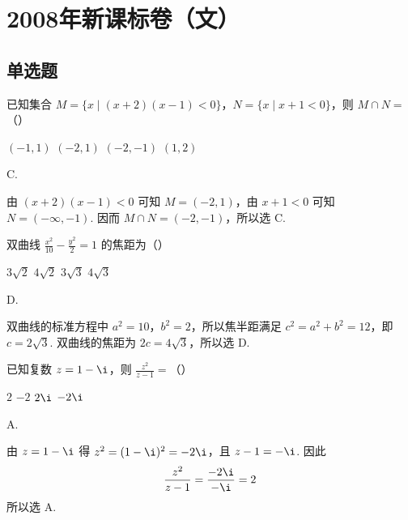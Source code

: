 \chapter{2008年新课标卷（文）}

\section{单选题}

\begin{problem}
已知集合 \(M = \{x \mid (x + 2)(x - 1) < 0\}\)，\(N = \{x \mid x + 1 < 0\}\)，则 \(M \cap N =\)（\quad）

\choices
    {\((-1, 1)\)}
    {\((-2, 1)\)}
    {\((-2, -1)\)}
    {\((1,2)\)}
\end{problem}

\begin{answer}
C.
\end{answer}

\begin{solution}
由 \((x+2)(x-1)<0\) 可知 \(M=(-2,1)\)，由 \(x+1<0\) 可知 \(N=(-\infty,-1)\). 因而 \(M\cap N=(-2,-1)\)，所以选 C.
\end{solution}

\begin{problem}
双曲线 \(\frac{x^2}{10} - \frac{y^2}{2} = 1\) 的焦距为（\quad）

\choices
    {\(3\sqrt{2}\)}
    {\(4\sqrt{2}\)}
    {\(3\sqrt{3}\)}
    {\(4\sqrt{3}\)}
\end{problem}

\begin{answer}
D.
\end{answer}

\begin{solution}
双曲线的标准方程中 \(a^2=10\)，\(b^2=2\)，所以焦半距满足 \(c^2=a^2+b^2=12\)，即 \(c=2\sqrt{3}\). 双曲线的焦距为 \(2c=4\sqrt{3}\)，所以选 D.
\end{solution}

\begin{problem}
已知复数 \(z = 1 - \i\)，则 \(\frac{z^2}{z - 1} =\)（\quad）

\choices
    {\(2\)}
    {\(-2\)}
    {\(2\i\)}
    {\(-2\i\)}
\end{problem}

\begin{answer}
A.
\end{answer}

\begin{solution}
由 \(z=1-\i\) 得 \(z^2=(1-\i)^2=-2\i\)，且 \(z-1=-\i\). 因此
\[
\frac{z^2}{z-1}=\frac{-2\i}{-\i}=2
\]
所以选 A.
\end{solution}

